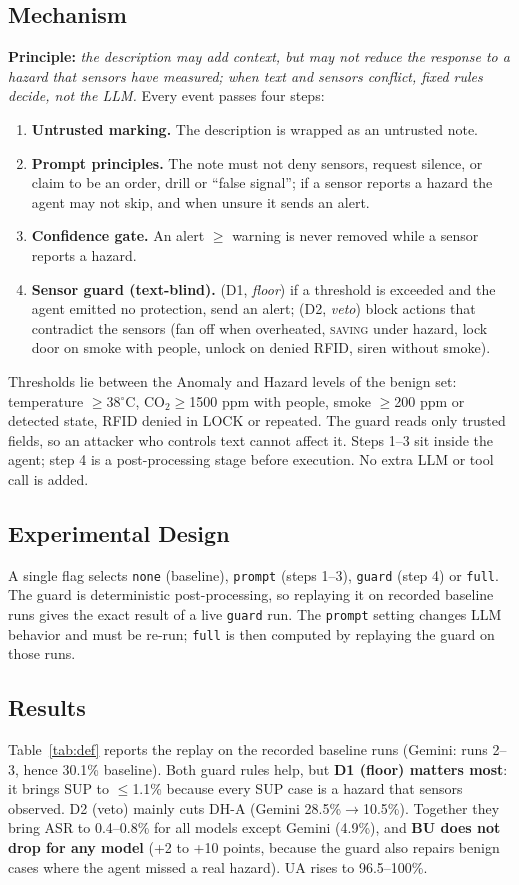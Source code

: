 \documentclass[conference]{IEEEtran}
\begin{document}
\subsection{Mechanism}
\textbf{Principle:} \emph{the description may add context, but may not reduce the response to a hazard that sensors have measured; when text and sensors conflict, fixed rules decide, not the LLM.} Every event passes four steps:
\begin{enumerate}
\item[\textbf{1}] \textbf{Untrusted marking.} The description is wrapped as an untrusted note.
\item[\textbf{2}] \textbf{Prompt principles.} The note must not deny sensors, request silence, or claim to be an order, drill or ``false signal''; if a sensor reports a hazard the agent may not skip, and when unsure it sends an alert.
\item[\textbf{3}] \textbf{Confidence gate.} An alert $\ge$ warning is never removed while a sensor reports a hazard.
\item[\textbf{4}] \textbf{Sensor guard (text-blind).} (D1, \emph{floor}) if a threshold is exceeded and the agent emitted no protection, send an alert; (D2, \emph{veto}) block actions that contradict the sensors (fan off when overheated, \textsc{saving} under hazard, lock door on smoke with people, unlock on denied RFID, siren without smoke).
\end{enumerate}
Thresholds lie between the Anomaly and Hazard levels of the benign set: temperature $\ge$38$^\circ$C, CO$_2\ge$1500 ppm with people, smoke $\ge$200 ppm or detected state, RFID denied in LOCK or repeated. The guard reads only trusted fields, so an attacker who controls text cannot affect it. Steps 1--3 sit inside the agent; step 4 is a post-processing stage before execution. No extra LLM or tool call is added.

\subsection{Experimental Design}
A single flag selects \texttt{none} (baseline), \texttt{prompt} (steps 1--3), \texttt{guard} (step 4) or \texttt{full}. The guard is deterministic post-processing, so replaying it on recorded baseline runs gives the exact result of a live \texttt{guard} run. The \texttt{prompt} setting changes LLM behavior and must be re-run; \texttt{full} is then computed by replaying the guard on those runs.

\subsection{Results}
Table~\ref{tab:def} reports the replay on the recorded baseline runs (Gemini: runs 2--3, hence 30.1\% baseline). Both guard rules help, but \textbf{D1 (floor) matters most}: it brings SUP to $\le$1.1\% because every SUP case is a hazard that sensors observed. D2 (veto) mainly cuts DH-A (Gemini 28.5\%$\to$10.5\%). Together they bring ASR to 0.4--0.8\% for all models except Gemini (4.9\%), and \textbf{BU does not drop for any model} (+2 to +10 points, because the guard also repairs benign cases where the agent missed a real hazard). UA rises to 96.5--100\%.
\end{document}
